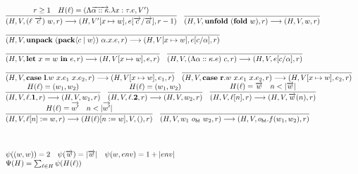 \documentclass[fleqn]{article}
\begin{document}
\[\begin{array}{l}
	\infer{(H,V,(\ell~\overrightarrow{c})~w,r) \longrightarrow (H,V'[x \mapsto w],e[\overrightarrow{c}/\overrightarrow{\alpha}],r-1) }{r \ge 1 & H(\ell) = (\Lambda \overrightarrow{\alpha :: \kappa}. \lambda x:\tau. e, V')} \hspace{1em}
	\infer{(H,V,\mathbf{unfold}~(\mathbf{fold}~w),r) \longrightarrow (H,V,w,r)}{} \\
	\infer{(H,V,\mathbf{unpack}~(\mathbf{pack} \langle c \mid w \rangle )~\alpha.x.e, r) \longrightarrow (H,V[x \mapsto w],e[c/\alpha],r)}{\vspace{1em}} \\
	\infer{(H,V,\mathbf{let}~x=w~\mathbf{in}~e,r) \longrightarrow (H,V[x \mapsto w],e,r)}{\vspace{1em}} \hspace{1em}
	\infer{(H,V,(\Lambda \alpha :: \kappa. e)~c,r) \longrightarrow (H,V,e[c/\alpha],r)}{\vspace{1em}} \\
	\infer{(H,V,\mathbf{case}~\mathbf{l}.w~x.e_1~x.e_2,r) \longrightarrow (H,V[x \mapsto w],e_1,r)}{\vspace{1em}} \hspace{1em}
	\infer{(H,V,\mathbf{case}~\mathbf{r}.w~x.e_1~x.e_2,r) \longrightarrow (H,V[x \mapsto w],e_2,r)}{\vspace{1em}} \\
	\infer{(H,V,\ell.\mathbf{1},r) \longrightarrow (H,V,w_1,r)}{H(\ell) = (w_1,w_2)} \hspace{1em}
	\infer{(H,V,\ell.\mathbf{2},r) \longrightarrow (H,V,w_2,r)}{H(\ell) = (w_1,w_2)} \hspace{1em}
	\infer{(H,V,\ell[n],r) \longrightarrow (H,V,\overrightarrow{w}(n),r)}{H(\ell)=\overrightarrow{w} & n < |\overrightarrow{w}|} \\
	\infer{(H,V,\ell[n] := w,r) \longrightarrow (H(\ell)[n := w],V,(),r)}{H(\ell) = \overrightarrow{w'} & n < |\overrightarrow{w'}|} \hspace{1em}
	\infer{(H,V,w_1~o_{bt}~w_2,r) \longrightarrow (H,V,o_{bt}.f(w_1,w_2),r)}{\vspace{1em}} \\
	\\
	\\
	\\
	\psi((w,w)) = 2 \hspace{1em} \psi(\overrightarrow{w}) = |\overrightarrow{w}| \hspace{1em} \psi(w,env)=1+|env| \\
	\Psi(H) = \sum_{\ell \in H} \psi(H(\ell)) \\

\end{array}\]
\end{document}
